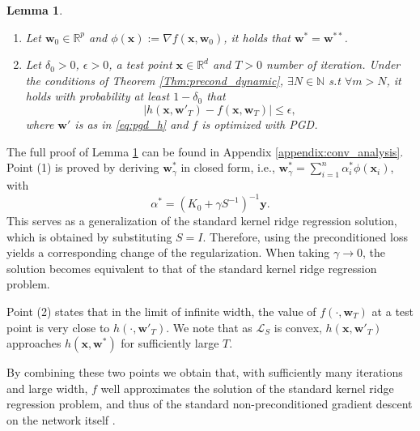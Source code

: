 \documentclass[10pt]{article} %
\theoremstyle{plain}
\newtheorem{lemma}[theorem]{Lemma}
\theoremstyle{definition}
\theoremstyle{remark}
\newcommand{\Real}{\mathbb{R}}
\newcommand{\abs}[1]{\left|#1\right|}
\newcommand{\x}{\mathbf{x}}
\newcommand{\y}{\mathbf{y}}
\newcommand{\w}{\mathbf{w}}
\begin{document}
\begin{lemma} \label{lem:conv_analysis}
    \begin{enumerate}
        \item Let $\w_0\in\Real^p$ and $\phi(\x):=\nabla f(\x,\w_0)$, it holds that $\w^*=\w^{**}$. 
        \item  Let $\delta_0 > 0$, $\epsilon>0$, a test point $\x\in\Real^d$ and $T>0$ number of iteration. Under the conditions of Theorem \ref{Thm:precond_dynamic}, $\exists N\in \mathbb{N}$ s.t $\forall m>N$, it holds with probability at least $1-\delta_0$ that
        \[
        \abs{h(\x,\w'_T)- f(\x,\w_T)} \leq \epsilon,
        \]
        where $\w'$ is as in \eqref{eq:pgd_h} and $f$ is optimized with PGD.
    \end{enumerate}
\end{lemma}
The full proof of Lemma \ref{lem:conv_analysis} can be found in Appendix \ref{appendix:conv_analysis}.
Point (1) is proved by deriving $\w^*_\gamma$ in closed form, i.e.,  $\w^*_\gamma = \sum_{i=1}^{n}\alpha^*_i\phi(\x_i)$, with
\[
\alpha^* = (K_0+\gamma S^{-1})^{-1}\y.
\]
This serves as a generalization of the standard kernel ridge regression solution, which is obtained by substituting $S=I$. Therefore, using the preconditioned loss yields a corresponding change of the regularization. When taking $\gamma\to 0$, the solution becomes equivalent to that of the standard kernel ridge regression problem.

Point (2) states that in the limit of infinite width, the value of $f(\cdot,\w_T)$ at a test point is very close to $h(\cdot,\w'_T)$. We note that as $\mathcal{L}_{S}$ is convex, $h(\x,\w'_T)$  approaches $h(\x,\w^*)$ for sufficiently large $T$. 

By combining these two points we obtain that, with sufficiently many iterations and large width, $f$ well approximates the solution of the standard kernel ridge regression problem, and thus of the standard non-preconditioned gradient descent on the network itself \citep{lee2019wide}.
\end{document}
